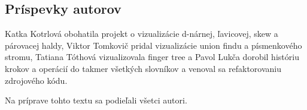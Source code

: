 \subsection{Príspevky autorov}
Katka Kotrlová obohatila projekt o vizualizácie d-nárnej, ľavicovej, skew a
párovacej haldy, Viktor Tomkovič pridal vizualizácie union findu a písmenkového
stromu, Tatiana Tóthová vizualizovala finger tree a Pavol Lukča dorobil históriu
krokov a operácií do takmer všetkých slovníkov a venoval sa refaktorovaniu
zdrojového kódu.

Na príprave tohto textu sa podieľali všetci autori.

